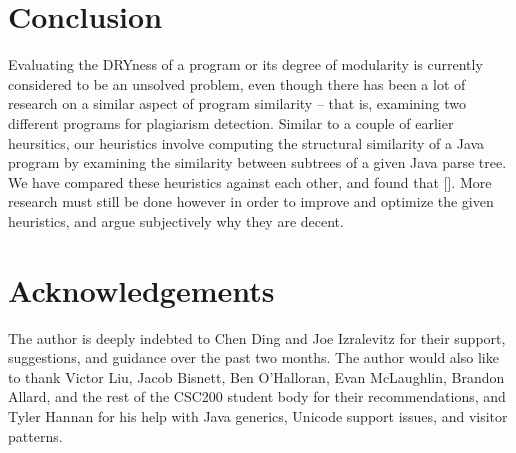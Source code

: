 \documentclass{article}
\begin{document}
\section{Conclusion}

Evaluating the DRYness of a program or its degree of modularity is currently considered to be an unsolved problem,
even though there has been a lot of research on a similar aspect of program similarity -- that is, examining two
different programs for plagiarism detection. Similar to a couple of earlier heursitics, our heuristics involve
computing the structural similarity of a Java program by examining the similarity between subtrees of a given Java parse tree. 
We have compared these heuristics against each other, and found that []. More research must still be done however in order to
improve and optimize the given heuristics, and argue subjectively why they are decent.

\section{Acknowledgements}

The author is deeply indebted to Chen Ding and Joe Izralevitz for their support, suggestions, and guidance over the past two months.
The author would also like to thank Victor Liu, Jacob Bisnett, Ben O'Halloran, Evan McLaughlin, Brandon Allard, and the rest of
the CSC200 student body for their recommendations, and Tyler Hannan for his help with Java generics, Unicode support issues, and
visitor patterns.



\pagebreak
\pagestyle{empty}



\end{document}
